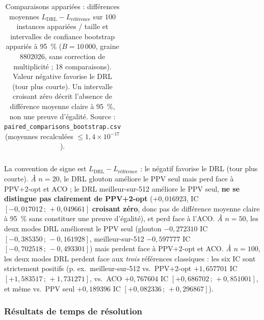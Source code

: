 \documentclass[12pt, a4paper, twoside, openright]{book}
\begin{document}
\begin{table}[H]
\begin{tabular}{cllccc}
\bottomrule
\end{tabular}
\caption[Comparaisons appariées et intervalles de confiance bootstrap]{Comparaisons appariées : différences moyennes $L_{\text{DRL}}-L_{\text{référence}}$ sur $100$ instances appariées / taille et intervalles de confiance bootstrap appariés à 95~\% ($B{=}10\,000$, graine $8802026$, sans correction de multiplicité ; 18 comparaisons). Valeur négative favorise le DRL (tour plus courte). Un intervalle croisant zéro décrit l'absence de différence moyenne claire à 95~\%, non une preuve d'égalité. Source : \texttt{paired\_comparisons\_bootstrap.csv} (moyennes recalculées $\le 1{,}4{\times}10^{-17}$).}
\label{tab:comparaisons-appariees-v1-1}
\end{table}

La convention de signe est $L_{\text{DRL}}-L_{\text{référence}}$ : le négatif favorise le DRL (tour plus courte). \emph{À $n=20$}, le DRL glouton améliore le PPV seul mais perd face à PPV+2-opt et ACO ; le DRL meilleur-sur-512 améliore le PPV seul, \textbf{ne se distingue pas clairement de PPV+2-opt} ($+0{,}016923$, IC $[-0{,}017012\,;\,+0{,}049661]$ \textbf{croisant zéro}, donc pas de différence moyenne claire à 95~\% sans constituer une preuve d'égalité), et perd face à l'ACO. \emph{À $n=50$}, les deux modes DRL améliorent le PPV seul (glouton $-0{,}272310$ IC $[-0{,}385350\,;\,-0{,}161928]$, meilleur-sur-512 $-0{,}597777$ IC $[-0{,}702518\,;\,-0{,}493301]$) mais perdent face à PPV+2-opt et ACO. \emph{À $n=100$}, les deux modes DRL perdent face aux \emph{trois} références classiques : les six IC sont strictement positifs (p. ex.\ meilleur-sur-512 vs.\ PPV+2-opt $+1{,}657701$ IC $[+1{,}583517\,;\,+1{,}731271]$, vs.\ ACO $+0{,}767604$ IC $[+0{,}686702\,;\,+0{,}851001]$, et même vs.\ PPV seul $+0{,}189396$ IC $[+0{,}082336\,;\,+0{,}296867]$).

\subsubsection{Résultats de temps de résolution}
\label{sec:eval-v1-1-temps}
\end{document}
